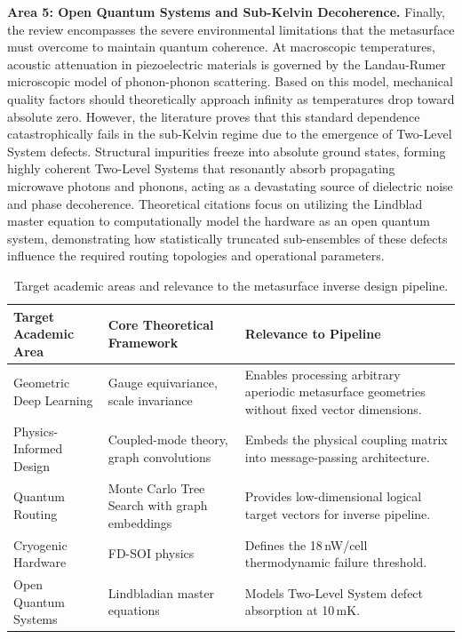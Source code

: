 \documentclass[11pt, a4paper]{article}
\begin{document}
\textbf{Area 5: Open Quantum Systems and Sub-Kelvin Decoherence.} Finally, the review encompasses the severe environmental limitations that the metasurface must overcome to maintain quantum coherence. At macroscopic temperatures, acoustic attenuation in piezoelectric materials is governed by the Landau-Rumer microscopic model of phonon-phonon scattering. Based on this model, mechanical quality factors should theoretically approach infinity as temperatures drop toward absolute zero. However, the literature proves that this standard dependence catastrophically fails in the sub-Kelvin regime due to the emergence of Two-Level System defects. Structural impurities freeze into absolute ground states, forming highly coherent Two-Level Systems that resonantly absorb propagating microwave photons and phonons, acting as a devastating source of dielectric noise and phase decoherence. Theoretical citations focus on utilizing the Lindblad master equation to computationally model the hardware as an open quantum system, demonstrating how statistically truncated sub-ensembles of these defects influence the required routing topologies and operational parameters.

\begin{table}[htbp]
\centering
\caption{Target academic areas and relevance to the metasurface inverse design pipeline.}
\label{tab:literature}
\begin{tabular}{@{}lll@{}}
\toprule
Target Academic Area & Core Theoretical Framework & Relevance to Pipeline \\
\midrule
Geometric Deep Learning & Gauge equivariance, scale invariance & Enables processing arbitrary aperiodic metasurface geometries without fixed vector dimensions. \\
Physics-Informed Design & Coupled-mode theory, graph convolutions & Embeds the physical coupling matrix into message-passing architecture. \\
Quantum Routing & Monte Carlo Tree Search with graph embeddings & Provides low-dimensional logical target vectors for inverse pipeline. \\
Cryogenic Hardware & FD-SOI physics & Defines the 18\,nW/cell thermodynamic failure threshold. \\
Open Quantum Systems & Lindbladian master equations & Models Two-Level System defect absorption at 10\,mK. \\
\bottomrule
\end{tabular}
\end{table}
\end{document}

